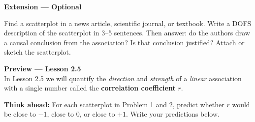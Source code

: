 \documentclass[10pt]{article}
\begin{document}
\vspace{0.2in}

\begin{extensionbox}
\small\textbf{Extension --- Optional}

Find a scatterplot in a news article, scientific journal, or textbook. Write a DOFS description
of the scatterplot in 3--5 sentences. Then answer: do the authors draw a causal conclusion from
the association? Is that conclusion justified? Attach or sketch the scatterplot.
\end{extensionbox}

\vspace{0.16in}

\begin{tcolorbox}[colback=greenbg, colframe=greenacc, boxrule=0.8pt, arc=2mm,
    left=4mm, right=4mm, top=3mm, bottom=3mm]
\small\textbf{Preview --- Lesson 2.5}\\[4pt]
In Lesson 2.5 we will quantify the \emph{direction} and \emph{strength} of a \textit{linear}
association with a single number called the \textbf{correlation coefficient} $r$.

\vspace{4pt}
\textbf{Think ahead:} For each scatterplot in Problem 1 and 2, predict whether $r$ would be
close to $-1$, close to $0$, or close to $+1$. Write your predictions below.\\[6pt]
\\[2pt]
\end{tcolorbox}
\end{document}
